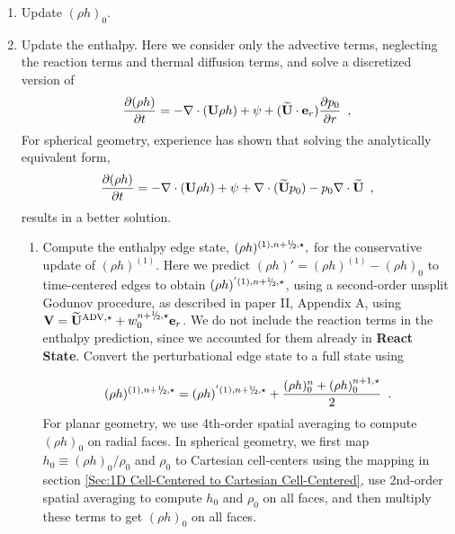 \begin{description}
\begin{enumerate}
\item Update $(\rho h)_0$.

\item Update the enthalpy.  Here we consider only the advective terms, 
neglecting the reaction terms and thermal diffusion terms, and solve a discretized version of
  \begin{equation}
  \frac{\partial (\rho h)}{\partial t}  = - \nabla \cdot ({\bf U} \rho h)
+ \psi + (\widetilde{{\bf U}} \cdot {\bf e}_r) \frac{\partial p_0}{\partial r} 
\enskip , \label{eq:rhohupdadv} 
  \end{equation}
For spherical geometry, experience has shown that solving the analytically equivalent form,
\begin{equation}
  \frac{\partial (\rho h)}{\partial t}  = - \nabla \cdot ({\bf U} \rho h)
+ \psi + \nabla \cdot (\widetilde{{\bf U}} p_0) - p_0 \nabla \cdot \widetilde{{\bf U}}  
\enskip , \label{eq:rhohupdadv2} 
\end{equation}
results in a better solution.

  \begin{enumerate}
  \renewcommand{\labelenumii}{{\bf \roman{enumii}}.}

  \item Compute the enthalpy edge state, $(\rho h)^{(1),\nph,\star},$
    for the conservative update of $(\rho h)^{(1)}.$  Here we predict 
    $(\rho h)' = (\rho h)^{(1)} - (\rho h)_0$ to time-centered edges to obtain 
    $(\rho h)^{'(1),\nph,\star}$, 
    using a second-order unsplit Godunov procedure, 
    as described in paper II, Appendix A, using $\Vb =
    \uadvone+w_0^{\nph,\star} \eb_r$.  We do not include the reaction
    terms in the enthalpy prediction, since we accounted for them
    already in {\bf React State}.  Convert the perturbational edge
    state to a full state using
    
\begin{equation}
(\rho h)^{(1),\nph,\star} = 
(\rho h)^{'(1),\nph,\star} + \frac{(\rho h)_0^n + (\rho h)_0^{n+1,\star}}{2}
\enskip .
\end{equation}
  For planar geometry, we use 4th-order spatial averaging to compute $(\rho h)_0$
  on radial faces.  In spherical geometry, we first map $h_0 \equiv (\rho h)_0/\rho_0$ 
  and $\rho_0$ to Cartesian cell-centers using the mapping in section 
  \ref{Sec:1D Cell-Centered to Cartesian Cell-Centered}, use 2nd-order spatial 
  averaging to compute $h_0$ and $\rho_0$ on all faces, and then multiply these 
  terms to get $(\rho h)_0$ on all faces.


\end{enumerate}
\end{enumerate}
\end{description}

